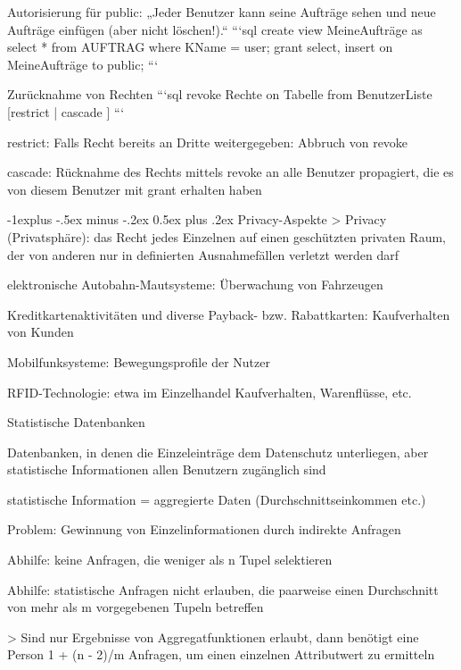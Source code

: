 \documentclass[a4paper]{article}
\makeatletter
\renewcommand{\subsection}{\@startsection{subsection}{2}{0mm}%
                                {-1explus -.5ex minus -.2ex}%
                                {0.5ex plus .2ex}%
                                {\normalfont\normalsize\bfseries}}
\makeatother
\begin{document}
\begin{multicols}{3}
\begin{itemize*}
        Autorisierung für public: „Jeder Benutzer kann seine Aufträge sehen und neue Aufträge einfügen (aber nicht löschen!).“
        ```sql
        create view MeineAufträge as
        select *
        from AUFTRAG
        where KName = user;
        grant select, insert
        on MeineAufträge
        to public;
        ```

        Zurücknahme von Rechten
        ```sql
        revoke Rechte
        on Tabelle
        from BenutzerListe
            [restrict | cascade ]
        ```
        \begin{itemize*}
            \item restrict: Falls Recht bereits an Dritte weitergegeben: Abbruch von revoke
            \item cascade: Rücknahme des Rechts mittels revoke an alle Benutzer propagiert, die es von diesem Benutzer mit grant erhalten haben
        \end{itemize*}


        \subsection{Privacy-Aspekte}
        > Privacy (Privatsphäre): das Recht jedes Einzelnen auf einen geschützten privaten Raum, der von anderen nur in definierten Ausnahmefällen verletzt werden darf
        \begin{itemize*}
            \item elektronische Autobahn-Mautsysteme: Überwachung von Fahrzeugen
            \item Kreditkartenaktivitäten und diverse Payback- bzw. Rabattkarten: Kaufverhalten von Kunden
            \item Mobilfunksysteme: Bewegungsprofile der Nutzer
            \item RFID-Technologie: etwa im Einzelhandel Kaufverhalten, Warenflüsse, etc.
        \end{itemize*}

        Statistische Datenbanken
        \begin{itemize*}
            \item Datenbanken, in denen die Einzeleinträge dem Datenschutz unterliegen, aber statistische Informationen allen Benutzern zugänglich sind
            \item statistische Information = aggregierte Daten (Durchschnittseinkommen etc.)
            \item Problem: Gewinnung von Einzelinformationen durch indirekte Anfragen
            \begin{itemize*}
                \item Abhilfe: keine Anfragen, die weniger als n Tupel selektieren
                \item Abhilfe: statistische Anfragen nicht erlauben, die paarweise einen Durchschnitt von mehr als m vorgegebenen Tupeln betreffen
            \end{itemize*}
        \end{itemize*}
        > Sind nur Ergebnisse von Aggregatfunktionen erlaubt, dann benötigt eine Person 1 + (n - 2)/m Anfragen, um einen einzelnen Attributwert zu ermitteln


\end{itemize*}
\end{multicols}
\end{document}
